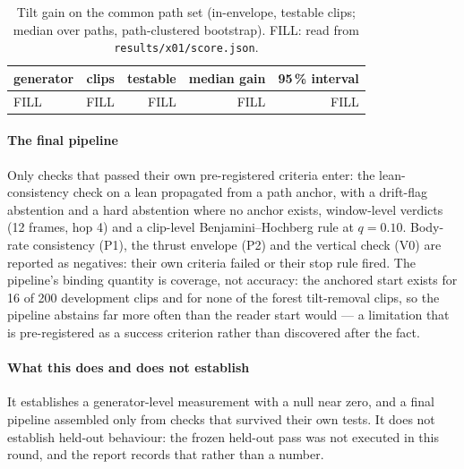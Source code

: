 \begin{table}[t]
\centering
\caption{Tilt gain on the common path set (in-envelope, testable clips; median over paths,
path-clustered bootstrap). FILL: read from \texttt{results/x01/score.json}.}
\label{tab:x-gain}
\begin{tabular}{lrrrr}
\toprule
generator & clips & testable & median gain & 95\,\% interval \\
\midrule
FILL & FILL & FILL & FILL & FILL \\
\bottomrule
\end{tabular}
\end{table}

\paragraph{The final pipeline}
Only checks that passed their own pre-registered criteria enter: the lean-consistency check on a
lean propagated from a path anchor, with a drift-flag abstention and a hard abstention where no
anchor exists, window-level verdicts (12 frames, hop 4) and a clip-level Benjamini--Hochberg rule
at $q=0.10$. Body-rate consistency (P1), the thrust envelope (P2) and the vertical check (V0) are
reported as negatives: their own criteria failed or their stop rule fired. The pipeline's binding
quantity is coverage, not accuracy: the anchored start exists for 16 of 200 development clips and
for none of the forest tilt-removal clips, so the pipeline abstains far more often than the reader
start would --- a limitation that is pre-registered as a success criterion rather than discovered
after the fact.

\paragraph{What this does and does not establish}
It establishes a generator-level measurement with a null near zero, and a final pipeline assembled
only from checks that survived their own tests. It does not establish held-out behaviour: the frozen
held-out pass was not executed in this round, and the report records that rather than a number.
